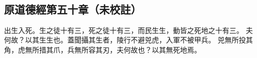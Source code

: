﻿%
%

\chapter{~}

\section{原道德經第五十章（未校註）}

\begin{withgezhu}

\zhsong


出生入死。生之徒十有三，死之徒十有三，而民生生，動皆之死地之十有三。
夫何故？以其生生也。蓋聞攝其生者，陵行不避兕虎，入軍不被甲兵。
兕無所投其角，虎無所措其爪，兵無所容其刃，夫何故也？以其無死地焉。

\end{withgezhu}
